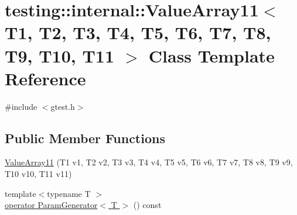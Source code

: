\hypertarget{classtesting_1_1internal_1_1_value_array11}{\section{testing\-:\-:internal\-:\-:Value\-Array11$<$ T1, T2, T3, T4, T5, T6, T7, T8, T9, T10, T11 $>$ Class Template Reference}
\label{classtesting_1_1internal_1_1_value_array11}
}


{\ttfamily \#include $<$gtest.\-h$>$}

\subsection*{Public Member Functions}
\begin{DoxyCompactItemize}
\item 
\hyperlink{classtesting_1_1internal_1_1_value_array11_a2b26f49e7c5856e86f4fae360cd22d47}{Value\-Array11} (T1 v1, T2 v2, T3 v3, T4 v4, T5 v5, T6 v6, T7 v7, T8 v8, T9 v9, T10 v10, T11 v11)
\item 
{\footnotesize template$<$typename T $>$ }\\\hyperlink{classtesting_1_1internal_1_1_value_array11_a39b9a36841b587e5be267cb33181f003}{operator Param\-Generator$<$ T $>$} () const 
\end{DoxyCompactItemize}



